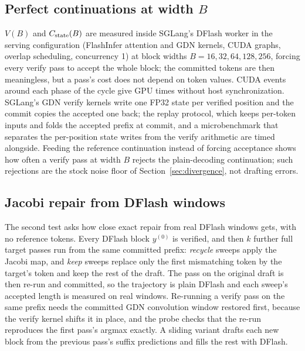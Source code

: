 \subsection{Perfect continuations at width \texorpdfstring{$B$}{B}}\label{sec:repair-stagea}
$V(B)$ and $C_{\rm state}(B)$ are measured inside SGLang's DFlash worker in the serving configuration (FlashInfer attention and GDN kernels, CUDA graphs, overlap scheduling, concurrency 1) at block widths $B=16,32,64,128,256$, forcing every verify pass to accept the whole block; the committed tokens are then meaningless, but a pass's cost does not depend on token values. CUDA events around each phase of the cycle give GPU times without host synchronization. SGLang's GDN verify kernels write one FP32 state per verified position and the commit copies the accepted one back; the replay protocol, which keeps per-token inputs and folds the accepted prefix at commit, and a microbenchmark that separates the per-position state writes from the verify arithmetic are timed alongside. Feeding the reference continuation instead of forcing acceptance shows how often a verify pass at width $B$ rejects the plain-decoding continuation; such rejections are the stock noise floor of Section~\ref{sec:divergence}, not drafting errors.


\subsection{Jacobi repair from DFlash windows}\label{sec:repair-jacobi}
The second test asks how close exact repair from real DFlash windows gets, with no reference tokens. Every DFlash block $y^{(0)}$ is verified, and then $k$ further full target passes run from the same committed prefix: \emph{recycle} sweeps apply the Jacobi map, and \emph{keep} sweeps replace only the first mismatching token by the target's token and keep the rest of the draft. The pass on the original draft is then re-run and committed, so the trajectory is plain DFlash and each sweep's accepted length is measured on real windows. Re-running a verify pass on the same prefix needs the committed GDN convolution window restored first, because the verify kernel shifts it in place, and the probe checks that the re-run reproduces the first pass's argmax exactly. A sliding variant drafts each new block from the previous pass's suffix predictions and fills the rest with DFlash.

